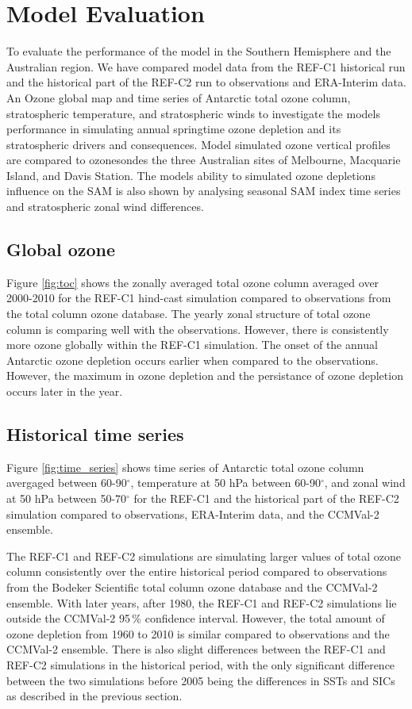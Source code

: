 \section{Model Evaluation}
To evaluate the performance of the model in the Southern Hemisphere and the Australian region. We have compared model data from the REF-C1 historical run and the historical part of the REF-C2 run to observations and ERA-Interim data. An Ozone global map and time series of Antarctic total ozone column, stratospheric temperature, and stratospheric winds to investigate the models performance in simulating annual springtime ozone depletion and its stratospheric drivers and consequences. Model simulated ozone vertical profiles are compared to ozonesondes the three Australian sites of Melbourne, Macquarie Island, and Davis Station. The models ability to simulated ozone depletions influence on the SAM is also shown by analysing seasonal SAM index time series and stratospheric zonal wind differences.

\subsection{Global ozone}
Figure \ref{fig:toc} shows the zonally averaged total ozone column averaged over 2000-2010 for the REF-C1 hind-cast simulation compared to observations from the total column ozone database. The yearly zonal structure of total ozone column is comparing well with the observations. However, there is consistently more ozone globally within the REF-C1 simulation. The onset of the annual Antarctic ozone depletion occurs earlier when compared to the observations. However, the maximum in ozone depletion and the persistance of ozone depletion occurs later in the year.

\subsection{Historical time series}
Figure \ref{fig:time_series} shows time series of Antarctic total ozone column avergaged between 60-90$^{\circ}$, temperature at 50 hPa between 60-90$^{\circ}$, and zonal wind at 50 hPa between 50-70$^{\circ}$ for the REF-C1 and the historical part of the REF-C2 simulation compared to observations, ERA-Interim data, and the CCMVal-2 ensemble.

The REF-C1 and REF-C2 simulations are simulating larger values of total ozone column consistently over the entire historical period compared to observations from the Bodeker Scientific total column ozone database and the CCMVal-2 ensemble. With later years, after 1980, the REF-C1 and REF-C2 simulations lie outside the CCMVal-2 95\,\% confidence interval. However, the total amount of ozone depletion from 1960 to 2010 is similar compared to observations and the CCMVal-2 ensemble. There is also slight differences between the REF-C1 and REF-C2 simulations in the historical period, with the only significant difference between the two simulations before 2005 being the differences in SSTs and SICs as described in the previous section. 

